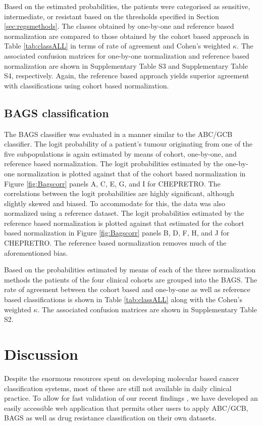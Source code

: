 \documentclass[twocolumn]{bmcart}%
\begin{document}
Based on the estimated probabilities, the patients were categorised as sensitive, intermediate, or resistant based on the thresholds specified in Section \ref{sec:regsmethods}.
The classes obtained by one-by-one and reference based normalization are compared to those obtained by the cohort based approach in Table \ref{tab:classALL} in terms of rate of agreement and Cohen's weighted $\kappa$.
The associated confusion matrices for one-by-one normalization and reference based normalization are shown in Supplementary Table S3 and Supplementary Table S4, respectively.
Again, the reference based approach yields superior agreement with classifications using cohort based normalization.


\subsection{BAGS classification}
The BAGS classifier was evaluated in a manner similar to the ABC/GCB classifier.
The logit probability of a patient's tumour originating from one of the five subpopulations is again estimated by means of cohort, one-by-one, and reference based normalization.
The logit probabilities estimated by the one-by-one normalization is plotted against that of the cohort based normalization in Figure \ref{fig:Bagscorr} panels A, C, E, G, and I for CHEPRETRO.
The correlations between the logit probabilities are highly significant, although slightly skewed and biased.
To accommodate for this, the data was also normalized using a reference dataset.
The logit probabilities estimated by the reference based normalization is plotted against that estimated for the cohort based normalization in Figure \ref{fig:Bagscorr} panels B, D, F, H, and J for CHEPRETRO.
The reference based normalization removes much of the aforementioned bias.

Based on the probabilities estimated by means of each of the three normalization methods the patients of the four clinical cohorts are grouped into the BAGS.
The rate of agreement between the cohort based and one-by-one as well as reference based classifications is shown in Table \ref{tab:classALL} along with the Cohen's weighted $\kappa$.
The associated confusion matrices are shown in Supplementary Table S2.%




\section{Discussion}
Despite the enormous resources spent on developing molecular based cancer classification systems,
most of these are still not available in daily clinical practice.
To allow for fast validation of our recent findings \cite{DybkaerBoegsted2015, Falgreen2015}, we have developed an easily accessible web application that permits other users to apply ABC/GCB, BAGS as well as drug resistance classification on their own datasets.
\end{document}
